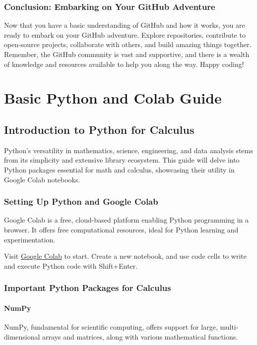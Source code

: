 \documentclass[a4paper,12pt]{book}
\begin{document}
\subsection*{Conclusion: Embarking on Your GitHub Adventure}

Now that you have a basic understanding of GitHub and how it works, you are ready to embark on your GitHub adventure. Explore repositories, contribute to open-source projects, collaborate with others, and build amazing things together. Remember, the GitHub community is vast and supportive, and there is a wealth of knowledge and resources available to help you along the way. Happy coding!


\chapter{Basic Python and Colab Guide}
\section*{Introduction to Python for Calculus}

Python's versatility in mathematics, science, engineering, and data analysis stems from its simplicity and extensive library ecosystem. This guide will delve into Python packages essential for math and calculus, showcasing their utility in Google Colab notebooks.

\subsection*{Setting Up Python and Google Colab}

Google Colab is a free, cloud-based platform enabling Python programming in a browser. It offers free computational resources, ideal for Python learning and experimentation.

Visit \href{https://colab.research.google.com/}{Google Colab} to start. Create a new notebook, and use code cells to write and execute Python code with Shift+Enter.

\subsection*{Important Python Packages for Calculus}

\subsubsection*{NumPy}
NumPy, fundamental for scientific computing, offers support for large, multi-dimensional arrays and matrices, along with various mathematical functions.
\end{document}
